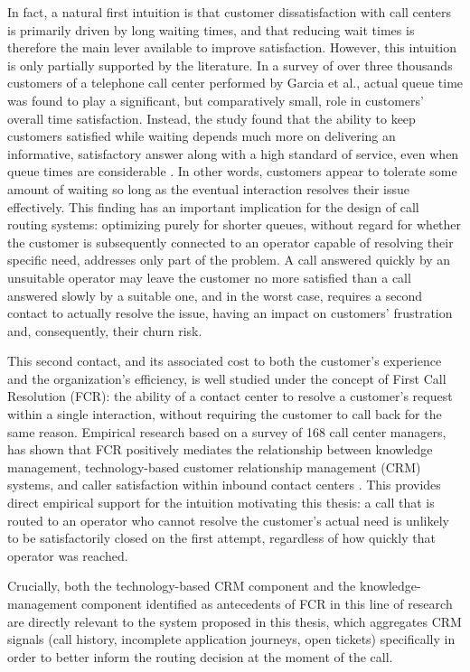 \documentclass[12pt,a4paper,openright,twoside]{book}
\begin{document}
In fact, a natural first intuition is that customer dissatisfaction with call centers is primarily driven by long waiting times,
and that reducing wait times is therefore the main lever available to improve satisfaction.
However, this intuition is only partially supported by the literature.
In a survey of over three thousands customers of a telephone call center performed by Garcia et al.,
actual queue time was found to play a significant, but comparatively small, role in customers' overall time satisfaction.
Instead, the study found that the ability to keep customers satisfied while waiting depends much more on delivering
an informative, satisfactory answer along with a high standard of service, even when queue times are considerable \cite{garcia2012waiting}.
In other words, customers appear to tolerate some amount of waiting so long as the eventual interaction resolves their issue effectively.
This finding has an important implication for the design of call routing systems:
optimizing purely for shorter queues, without regard for whether the customer is subsequently connected to an operator capable of resolving their specific need,
addresses only part of the problem. A call answered quickly by an unsuitable operator may leave the customer no more satisfied
than a call answered slowly by a suitable one, and in the worst case, requires a second contact to actually resolve the issue,
having an impact on customers' frustration and, consequently, their churn risk.

This second contact, and its associated cost to both the customer's experience and the organization's efficiency,
is well studied under the concept of First Call Resolution (FCR): the ability of a contact center to resolve a customer's
request within a single interaction, without requiring the customer to call back for the same reason.
Empirical research based on a survey of 168 call center managers, has shown that FCR positively mediates the relationship between
knowledge management, technology-based customer relationship management (CRM) systems, and caller satisfaction within inbound contact centers \cite{abdullateef2011mediating}.
This provides direct empirical support for the intuition motivating this thesis: a call that is routed to an operator who cannot resolve the customer's actual need
is unlikely to be satisfactorily closed on the first attempt, regardless of how quickly that operator was reached.

Crucially, both the technology-based CRM component and the knowledge-management component identified as antecedents of FCR in this line of research
are directly relevant to the system proposed in this thesis, which aggregates CRM signals (call history, incomplete application journeys, open tickets)
specifically in order to better inform the routing decision at the moment of the call.
\end{document}
